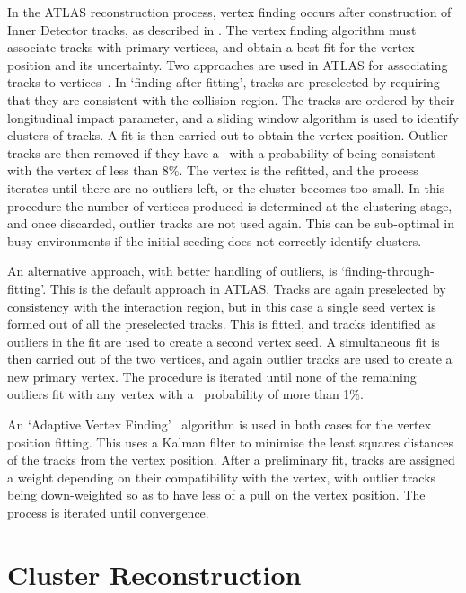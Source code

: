 In the ATLAS reconstruction process, vertex finding occurs after construction of
Inner Detector tracks, as described in . The
vertex finding algorithm must associate tracks with primary vertices, and obtain
a best fit for the vertex position and its uncertainty. Two approaches are
used in ATLAS for associating tracks to vertices~\cite{1742-6596-119-3-032033}. 
In `finding-after-fitting',
tracks are preselected by requiring that they are consistent with the collision
region. The tracks are ordered by their longitudinal impact parameter, and a
sliding window algorithm is used to identify clusters of tracks. A fit is then
carried out to obtain the vertex position. Outlier tracks are then removed if
they have a \chisquared\ with a probability of being consistent with the vertex
of less than 8\%. The vertex is the refitted, and the process iterates until
there are no outliers left, or the cluster becomes too small. In this procedure
the number of vertices produced is determined at the clustering stage, and
once discarded, outlier tracks are not used again. This can be sub-optimal in
busy environments if the initial seeding does not correctly identify clusters.

An alternative approach, with better handling of outliers, is
`finding-through-fitting'. This is the default approach in ATLAS. Tracks are
again preselected by consistency with the interaction region, but in this case a
single seed vertex is formed out of all the preselected tracks. This is fitted, and
tracks identified as outliers in the fit are used to create a second vertex
seed. A simultaneous fit is then carried out of the two vertices, and again
outlier tracks are used to create a new primary vertex. The procedure is
iterated until none of the remaining outliers fit with any vertex with a
\chisquared\ probability of more than 1\%.

An `Adaptive Vertex Finding'~\cite{0954-3899-34-12-N01} algorithm is used in
both cases for the vertex position fitting. 
This uses a Kalman filter to minimise the least squares distances of the tracks from
the vertex position. After a preliminary fit, tracks are assigned a
weight depending on their compatibility with the vertex, with outlier tracks
being down-weighted so as to have less of a pull on the vertex position. The
process is iterated until convergence.

\section{Cluster Reconstruction}
\label{sec:reco-clustering}

